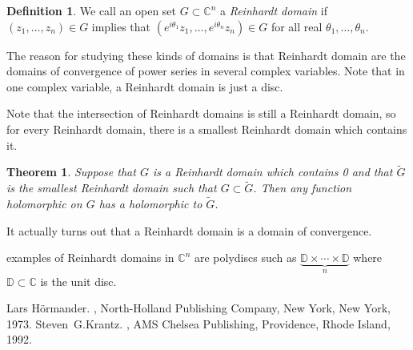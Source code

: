 \documentclass[12pt]{article}
\theoremstyle{theorem}
\newtheorem*{thm}{Theorem}
\theoremstyle{definition}
\newtheorem*{defn}{Definition}
\begin{document}
\begin{defn}
We call an open set $G \subset {\mathbb{C}}^n$ a {\em Reinhardt domain}
if $(z_1,\ldots,z_n) \in G$ implies that 
$(e^{i\theta_1}z_1,\ldots,e^{i\theta_n}z_n) \in G$ for all real
$\theta_1,\ldots,\theta_n$.
\end{defn}

The reason for studying these kinds of domains is that
Reinhardt domain are the domains of convergence of power series in
several complex variables.  Note that in one complex variable, a 
Reinhardt domain is just a disc.

Note that the intersection of
Reinhardt domains is still a
Reinhardt domain, so for every Reinhardt domain, there is a smallest
Reinhardt domain which contains it.

\begin{thm}
Suppose that $G$ is a Reinhardt domain which contains 0 and
that $\tilde{G}$ is the smallest 
Reinhardt domain such that $G \subset \tilde{G}$.  Then
any function holomorphic on $G$ has a holomorphic 
to $\tilde{G}$.
\end{thm}

It actually turns out that a 
Reinhardt domain is a domain of convergence.

 examples of 
Reinhardt domains in ${\mathbb{C}}^n$ are polydiscs such as
$\underbrace{{\mathbb{D}} \times \cdots \times {\mathbb{D}}}_n$
where ${\mathbb{D}} \subset {\mathbb{C}}$ is the unit disc.

\begin{thebibliography}{9}
Lars H\"ormander.
{\em {}},
North-Holland Publishing Company, New York, New York, 1973.
Steven~G.\@ Krantz.
{\em {}},
AMS Chelsea Publishing, Providence, Rhode Island, 1992.
\end{thebibliography}
\end{document}
